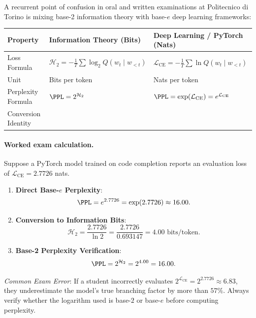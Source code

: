 \documentclass[../../main.tex]{subfiles}
\begin{document}
\begin{examinsight}
A recurrent point of confusion in oral and written examinations at Politecnico di Torino is mixing base-2 information theory with base-$e$ deep learning frameworks:
\begin{center}
\begin{tabularx}{\linewidth}{l >{\raggedright\arraybackslash}X >{\raggedright\arraybackslash}X}
\toprule
\textbf{Property} & \textbf{Information Theory (Bits)} & \textbf{Deep Learning / PyTorch (Nats)} \\
\midrule
Loss Formula & $\mathcal{H}_2 = -\frac{1}{T} \sum \log_2 Q(w_t \mid w_{<t})$ & $\mathcal{L}_{\text{CE}} = -\frac{1}{T} \sum \ln Q(w_t \mid w_{<t})$ \\
Unit & Bits per token & Nats per token \\
Perplexity Formula & $\PPL = 2^{\mathcal{H}_2}$ & $\PPL = \exp(\mathcal{L}_{\text{CE}}) = e^{\mathcal{L}_{\text{CE}}}$ \\
Conversion Identity & \multicolumn{2}{c}{$\mathcal{H}_2 = \frac{\mathcal{L}_{\text{CE}}}{\ln 2} \approx \frac{\mathcal{L}_{\text{CE}}}{0.693147}, \quad \mathcal{L}_{\text{CE}} = \mathcal{H}_2 \cdot \ln 2 \approx 0.693147 \cdot \mathcal{H}_2$} \\
\bottomrule
\end{tabularx}
\end{center}

\paragraph{Worked exam calculation.}
Suppose a PyTorch model trained on code completion reports an evaluation loss of $\mathcal{L}_{\text{CE}} = 2.7726$ nats.
\begin{enumerate}
    \item \textbf{Direct Base-$e$ Perplexity}:
    \[
    \PPL = e^{2.7726} = \exp(2.7726) \approx 16.00.
    \]
    \item \textbf{Conversion to Information Bits}:
    \[
    \mathcal{H}_2 = \frac{2.7726}{\ln 2} = \frac{2.7726}{0.693147} = 4.00 \text{ bits/token}.
    \]
    \item \textbf{Base-2 Perplexity Verification}:
    \[
    \PPL = 2^{\mathcal{H}_2} = 2^{4.00} = 16.00.
    \]
\end{enumerate}
\emph{Common Exam Error}: If a student incorrectly evaluates $2^{\mathcal{L}_{\text{CE}}} = 2^{2.7726} \approx 6.83$, they underestimate the model's true branching factor by more than $57\%$. Always verify whether the logarithm used is base-$2$ or base-$e$ before computing perplexity.
\end{examinsight}
\end{document}
